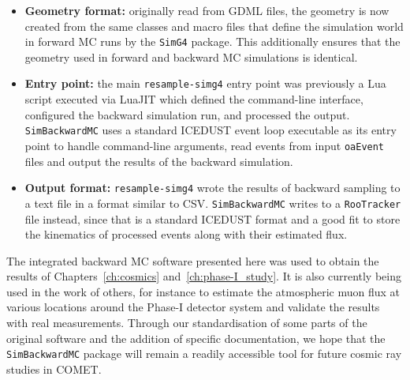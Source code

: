 \begin{itemize}
    \item {\bfseries Geometry format:} originally read from GDML files, the
    geometry is now created from the same classes and macro files that define
    the simulation world in forward MC runs by the \texttt{SimG4} package. This
    additionally ensures that the geometry used in forward and backward MC
    simulations is identical.
    \item {\bfseries Entry point:} the main \texttt{resample-simg4} entry point
    was previously a Lua script executed via LuaJIT which defined the
    command-line interface, configured the backward simulation run, and
    processed the output. \texttt{SimBackwardMC} uses a standard ICEDUST event
    loop executable as its entry point to handle command-line arguments, read
    events from input \texttt{oaEvent} files and output the results of the
    backward simulation.
    \item {\bfseries Output format:} \texttt{resample-simg4} wrote the results
    of backward sampling to a text file in a format similar to CSV.
    \texttt{SimBackwardMC} writes to a \texttt{RooTracker} file instead, since
    that is a standard ICEDUST format and a good fit to store the kinematics of
    processed events along with their estimated flux.
\end{itemize}

The integrated backward MC software presented here was used to obtain the
results of Chapters~\ref{ch:cosmics} and~\ref{ch:phase-I_study}. It is also
currently being used in the work of others, for instance to estimate the
atmospheric muon flux at various locations around the Phase-I detector system
and validate the results with real measurements. Through our standardisation of
some parts of the original software and the addition of specific documentation,
we hope that the \texttt{SimBackwardMC} package will remain a readily accessible
tool for future cosmic ray studies in COMET.
